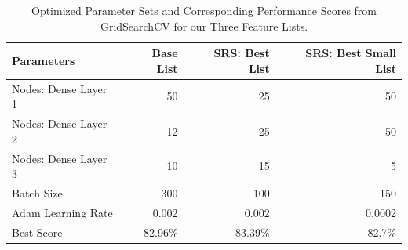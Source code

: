 \documentclass[]{article}
\begin{document}
\begin{table}[h!]
	\centering
	\begin{tabular}{@{}lrrr@{}}
		\toprule
		Parameters           & Base List & SRS: Best List & SRS: Best Small List \\ \midrule

		Nodes: Dense Layer 1 & 50        & 25             & 50                                                  \\
		Nodes: Dense Layer 2 & 12        & 25             & 50                                                  \\
		Nodes: Dense Layer 3 & 10        & 15             & 5                                                   \\
				Batch Size          & 300       & 100            & 150                                                 \\
		Adam Learning Rate   & 0.002     & 0.002          & 0.0002                                              \\
		Best Score           & 82.96\%   & 83.39\%        & 82.7\%  \\
		\bottomrule                                            
	\end{tabular}
	\caption{Optimized Parameter Sets and Corresponding Performance Scores from GridSearchCV for our Three Feature Lists.} 
	\label{table:best_params_gridsearchCV}
	
\end{table}
\end{document}
